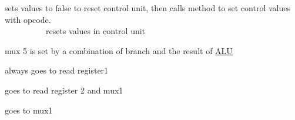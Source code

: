 sets values to false to reset control unit, then calls method to set control values with opcode. ~\newline
~\newline
~\newline
~\newline
~\newline
~\newline
~\newline
~\newline
~\newline
~\newline
~\newline
~\newline
~\newline
~\newline
~\newline
~\newline
~\newline
~\newline
~\newline
~\newline
~\newline
~\newline
~\newline
~\newline
~\newline
~\newline
~\newline
~\newline
~\newline
~\newline
~\newline
~\newline
~\newline
~\newline
~\newline
~\newline
~\newline
~\newline
~\newline
~\newline
~\newline
~\newline
 resets values in control unit

mux 5 is set by a combination of branch and the result of \mbox{\hyperlink{class_a_l_u}{A\+LU}}

always goes to read register1

goes to read register 2 and mux1

goes to mux1


